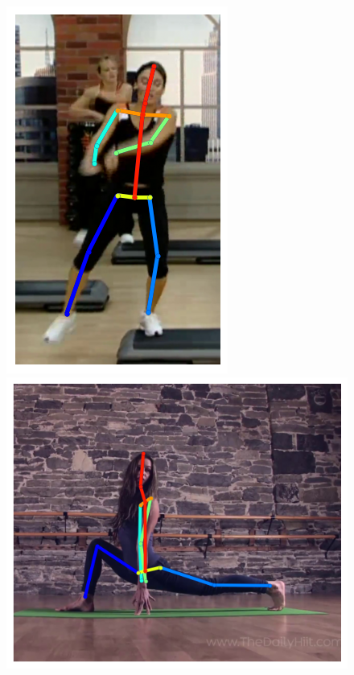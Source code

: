 \begin{figure}[t!]
    \includegraphics[height=\flowhh]{resources/Human_Poses/qualitative/img-11}
    \hfill
    \includegraphics[height=\flowhh]{resources/Human_Poses/qualitative/img-12}
    \\

\end{figure}
